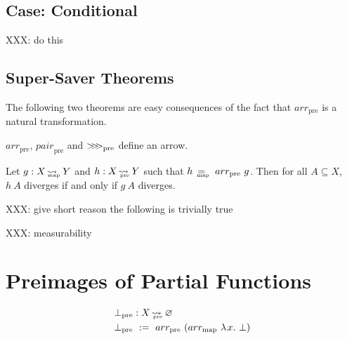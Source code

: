 \documentclass[preprint]{sigplanconf}
\newcommand{\arrowarr}{\ensuremath{arr}}
\newcommand{\arrowcomp}{\ensuremath{{>}\mspace{-6mu}{>}\mspace{-6mu}{>}}}
\newcommand{\arrowpair}{\ensuremath{pair}}
\newcommand{\map}{_\mathrm{map}}
\DeclareMathOperator{\mapto}{\rightsquigarrow_{\mspace{-21mu}\map}}
\DeclareMathOperator{\eqmap}{\mbox{\ensuremath{=_{\mspace{-19mu}\map}}}}
\newcommand{\arrmap}{\arrowarr\map}
\newcommand{\pre}{_\mathrm{pre}}
\DeclareMathOperator{\preto}{\rightsquigarrow_{\mspace{-19mu}\pre}}
\newcommand{\arrpre}{\arrowarr\pre}
\newcommand{\comppre}{\arrowcomp\pre}
\newcommand{\pairpre}{\arrowpair\pre}
\begin{document}
\subsection{Case: Conditional}

XXX: do this


\subsection{Super-Saver Theorems}

The following two theorems are easy consequences of the fact that $\arrpre$ is a natural transformation.

\begin{corollary}
$\arrpre$, $\pairpre$ and $\comppre$ define an arrow.
\end{corollary}

\begin{corollary}
Let $g : X \mapto Y$ and $h : X \preto Y$ such that $h \ \eqmap \ \arrpre~g$.
Then for all $A \subseteq X$, $h~A$ diverges if and only if $g~A$ diverges.
\end{corollary}

XXX: give short reason the following is trivially true
\begin{corollary}
XXX: measurability
\end{corollary}

\section{Preimages of Partial Functions}

\begin{equation}
\begin{aligned}
	&\bot\pre : X \preto \emptyset \\
	&\bot\pre \ := \ \arrpre~(\arrmap~\fun{x}\bot)
\end{aligned}
\end{equation}






\end{document}
